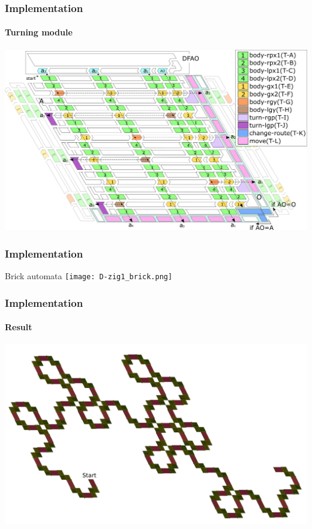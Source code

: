 \documentclass[dvipdfmx,10pt]{beamer}
\begin{document}
\begin{frame}
\frametitle{Implementation}
\framesubtitle{Turning module}

\centering
\includegraphics[width=\linewidth]{overall_turn_part.png}

\end{frame}

\begin{frame}
\frametitle{Implementation}


\begin{alertblock}{Brick automata}
\centering
\texttt{[image: D-zig1\_brick.png]}
\end{alertblock}

\end{frame}

\begin{frame}
\frametitle{Implementation}
\framesubtitle{Result}

\centering
\href{run:dragon.mp4}{
\includegraphics[width=\linewidth]{6bit_heighway.pdf}
}
\end{frame}
\end{document}
